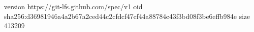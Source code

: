 version https://git-lfs.github.com/spec/v1
oid sha256:d36981946a4a2b67a2ced44c2cfdcf47cf44a88784c43f3bd08f3be6effb984e
size 413209
